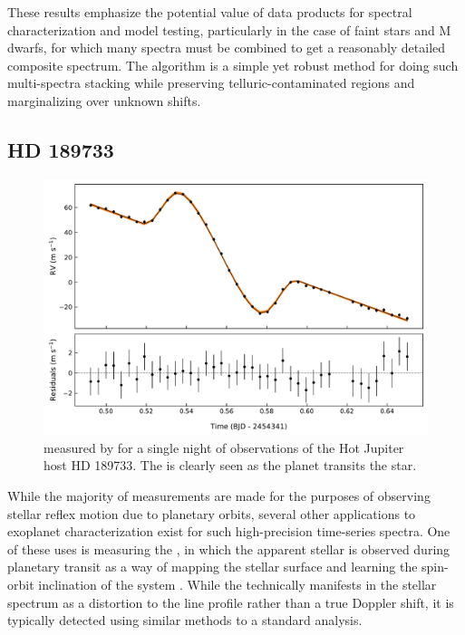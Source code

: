 \documentclass[modern]{aastex62}
\begin{document}
These results emphasize the potential value of \wobble data products for spectral characterization and model testing, particularly in the case of faint stars and M dwarfs, for which many spectra must be combined to get a reasonably detailed composite spectrum.
The \wobble algorithm is a simple yet robust method for doing such multi-spectra stacking while preserving telluric-contaminated regions and marginalizing over unknown \RV shifts.

\subsection{HD 189733}

\begin{figure}
\centering
\includegraphics[width=5in]{hd189_rm}
\caption{\RVs measured by \wobble for a single night of observations of the Hot Jupiter host HD 189733. The \RM is clearly seen as the planet transits the star. }
\label{fig:hd189_rm}
\end{figure}

While the majority of \EPRV measurements are made for the purposes of observing stellar reflex motion due to planetary orbits, several other applications to exoplanet characterization exist for such high-precision time-series spectra.
One of these uses is measuring the \RM, in which the apparent stellar \RV is observed during planetary transit as a way of mapping the stellar surface and learning the spin-orbit inclination of the system \citep[e.g.][]{Queloz2000, Winn2005}.
While the \RM technically manifests in the stellar spectrum as a distortion to the line profile rather than a true Doppler shift, it is typically detected using similar methods to a standard \RV analysis.
\end{document}
